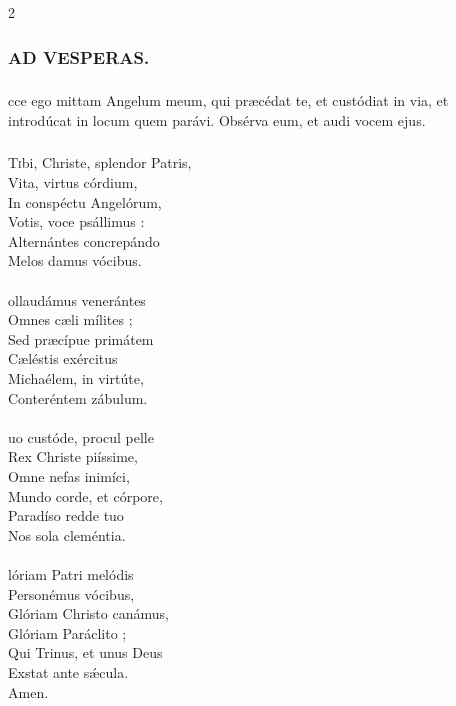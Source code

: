 \documentclass[9pt,twoside]{extarticle}
\begin{document}
\begin{multicols}{2}
{{\subsubsection*{\center {}}


\subsubsection*{\center \textsc{AD VESPERAS.}}
\subsubsection*{}
cce ego mittam Angelum meum, qui præcédat te, et custódiat in via, et introdúcat in locum quem parávi. Obsérva eum, et audi vocem ejus.

\subsubsection*{\center {}}
\lettrine{T}ibi, Christe, splendor Patris,\\
Vita, virtus córdium,\\
In conspéctu Angelórum,\\
Votis, voce psállimus :\\
Alternántes concrepándo\\
Melos damus vócibus.\\
\\
ollaudámus venerántes\\
Omnes cæli mílites ;\\
Sed præcípue primátem\\
Cæléstis exércitus\\
Michaélem, in virtúte,\\
Conteréntem zábulum.\\
\\
uo custóde, procul pelle\\
Rex Christe piíssime,\\
Omne nefas inimíci,\\
Mundo corde, et córpore,\\
Paradíso redde tuo\\
Nos sola cleméntia.\\
\\
lóriam Patri melódis\\
Personémus vócibus,\\
Glóriam Christo canámus,\\
Glóriam Paráclito ;\\
Qui Trinus, et unus Deus\\
Exstat ante sǽcula.\\
Amen.

}}
\end{multicols}
\end{document}
